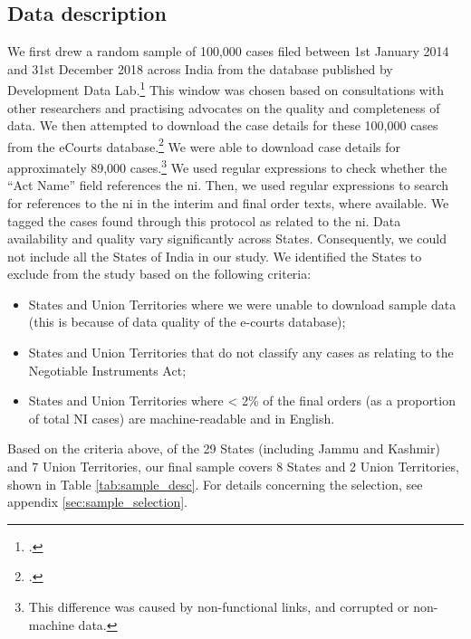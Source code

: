 \subsection{Data description} \label{sec:data-description}

We first drew a random sample of 100,000 cases filed between 1st January 2014 and 31st December 2018 across India from the database published by Development Data Lab.\footcite{devdatalabs2021_eCourtsData} This window was chosen based on consultations with other researchers and practising advocates on the quality and completeness of data. We then attempted to download the case details for these 100,000 cases from the eCourts database.\footcite{ecourts2022} We were able to download case details for approximately 89,000 cases.\footnote{This difference was caused by non-functional links, and corrupted or non-machine data.} We used regular expressions to check whether the ``Act Name'' field references the \gls{ni}. Then, we used regular expressions to search for references to the \gls{ni} in the interim and final order texts, where available. We tagged the cases found through this protocol as related to the \gls{ni}. Data availability and quality vary significantly across States. Consequently, we could not include all the States of India in our study. We identified the States to exclude from the study based on the following criteria:

\begin{itemize}
\item States and Union Territories where we were unable to download sample data (this is because of data quality of the e-courts database);
\item States and Union Territories that do not classify any cases as relating to the Negotiable Instruments Act;
\item States and Union Territories where < 2\% of the final orders (as a proportion of total NI cases) are machine-readable and in English.
\end{itemize}

Based on the criteria above, of the 29 States (including Jammu and Kashmir) and 7 Union Territories, our final sample covers 8 States and 2 Union Territories, shown in Table \ref{tab:sample_desc}. For details concerning the selection, see appendix \ref{sec:sample_selection}.

